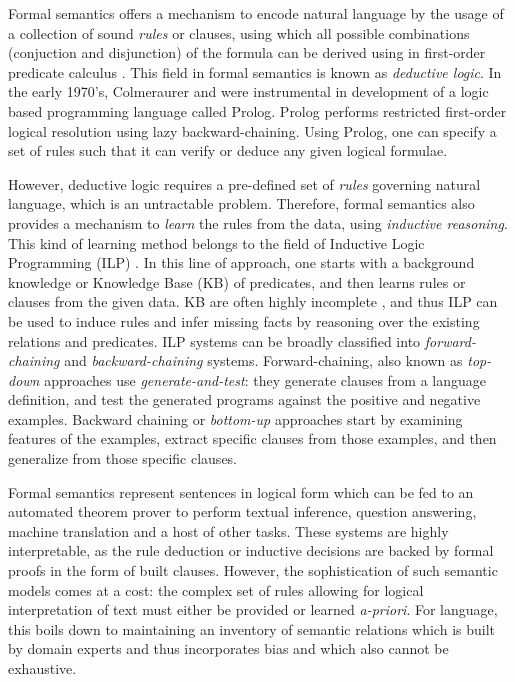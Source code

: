 \documentclass[letterpaper, 12pt]{report}
\begin{document}
Formal semantics offers a mechanism to encode natural language by the usage of a collection of sound \textit{rules} or clauses, using which all possible combinations (conjuction and disjunction) of the formula can be derived using in first-order predicate calculus \cite{hofstadter1980godel}.
This field in formal semantics is known as \textit{deductive logic}. In the early 1970's, Colmeraurer and \citet{kowalski1979logic} were instrumental in development of a logic based programming language called Prolog. Prolog performs restricted first-order logical resolution using lazy backward-chaining. Using Prolog, one can specify a set of rules such that it can verify or deduce any given logical formulae.

However, deductive logic requires a pre-defined set of \textit{rules} governing natural language, which is an untractable problem. Therefore, formal semantics also provides a mechanism to \textit{learn} the rules from the data, using \textit{inductive reasoning}. This kind of learning method belongs to the field of Inductive Logic Programming (ILP) \cite{dvzeroski2009relational}. In this line of approach, one starts with a background knowledge or Knowledge Base (KB) of predicates, and then learns rules or clauses from the given data. KB are often highly incomplete \cite{min2013distant}, and thus ILP can be used to induce rules and infer missing facts by reasoning over the existing relations and predicates. ILP systems can be broadly classified into \textit{forward-chaining} and \textit{backward-chaining} systems. Forward-chaining, also known as \textit{top-down} approaches use \textit{generate-and-test}: they generate clauses from a language definition, and test the generated programs against the positive and negative examples. Backward chaining or \textit{bottom-up} approaches start by examining features of the examples, extract specific clauses from those examples, and then generalize from those specific clauses.

Formal semantics represent sentences in logical form which can be fed to an automated theorem prover to perform textual inference, question answering, machine translation and a host of other tasks.
These systems are highly interpretable, as the rule deduction or inductive decisions are backed by formal proofs in the form of built clauses. However, the sophistication of such semantic models comes at a cost: the complex set of rules allowing for logical interpretation of text must either be provided or learned \textit{a-priori}. For language, this boils down to maintaining an inventory of semantic relations \cite{MacCartney2009-sz} which is built by domain experts and thus incorporates bias and which also cannot be exhaustive.
\end{document}
